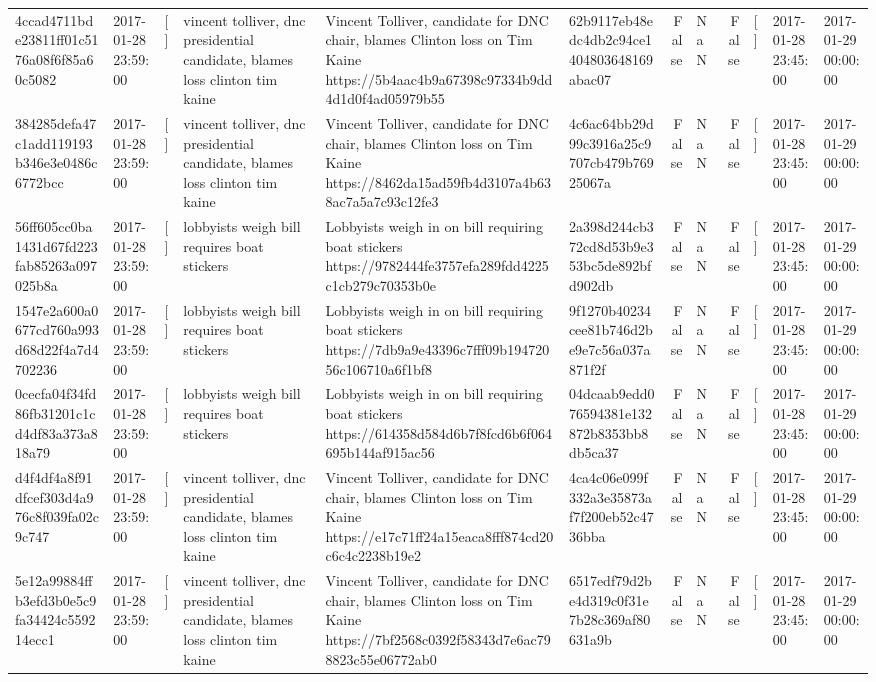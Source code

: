 \begin{tabular}{llllllrlrlll}
4ccad4711bde23811ff01c5176a08f6f85a60c5082 & 2017-01-28 23:59:00 & [] & vincent tolliver, dnc presidential candidate, blames loss clinton tim kaine & Vincent Tolliver, candidate for DNC chair, blames Clinton loss on Tim Kaine https://5b4aac4b9a67398c97334b9dd4d1d0f4ad05979b55 & 62b9117eb48edc4db2c94ce1404803648169abac07 & False & NaN & False & [] & 2017-01-28 23:45:00 & 2017-01-29 00:00:00 \\
384285defa47c1add119193b346e3e0486c6772bcc & 2017-01-28 23:59:00 & [] & vincent tolliver, dnc presidential candidate, blames loss clinton tim kaine & Vincent Tolliver, candidate for DNC chair, blames Clinton loss on Tim Kaine https://8462da15ad59fb4d3107a4b638ac7a5a7c93c12fe3 & 4c6ac64bb29d99c3916a25c9707cb479b76925067a & False & NaN & False & [] & 2017-01-28 23:45:00 & 2017-01-29 00:00:00 \\
56ff605cc0ba1431d67fd223fab85263a097025b8a & 2017-01-28 23:59:00 & [] & lobbyists weigh bill requires boat stickers & Lobbyists weigh in on bill requiring boat stickers https://9782444fe3757efa289fdd4225c1cb279c70353b0e & 2a398d244cb372cd8d53b9e353bc5de892bfd902db & False & NaN & False & [] & 2017-01-28 23:45:00 & 2017-01-29 00:00:00 \\
1547e2a600a0677cd760a993d68d22f4a7d4702236 & 2017-01-28 23:59:00 & [] & lobbyists weigh bill requires boat stickers & Lobbyists weigh in on bill requiring boat stickers https://7db9a9e43396c7fff09b19472056c106710a6f1bf8 & 9f1270b40234cee81b746d2be9e7c56a037a871f2f & False & NaN & False & [] & 2017-01-28 23:45:00 & 2017-01-29 00:00:00 \\
0cecfa04f34fd86fb31201c1cd4df83a373a818a79 & 2017-01-28 23:59:00 & [] & lobbyists weigh bill requires boat stickers & Lobbyists weigh in on bill requiring boat stickers https://614358d584d6b7f8fcd6b6f064695b144af915ac56 & 04dcaab9edd076594381e132872b8353bb8db5ca37 & False & NaN & False & [] & 2017-01-28 23:45:00 & 2017-01-29 00:00:00 \\
d4f4df4a8f91dfcef303d4a976c8f039fa02c9c747 & 2017-01-28 23:59:00 & [] & vincent tolliver, dnc presidential candidate, blames loss clinton tim kaine & Vincent Tolliver, candidate for DNC chair, blames Clinton loss on Tim Kaine https://e17c71ff24a15eaca8fff874cd20c6c4c2238b19e2 & 4ca4c06e099f332a3e35873af7f200eb52c4736bba & False & NaN & False & [] & 2017-01-28 23:45:00 & 2017-01-29 00:00:00 \\
5e12a99884ffb3efd3b0e5c9fa34424c559214ecc1 & 2017-01-28 23:59:00 & [] & vincent tolliver, dnc presidential candidate, blames loss clinton tim kaine & Vincent Tolliver, candidate for DNC chair, blames Clinton loss on Tim Kaine https://7bf2568c0392f58343d7e6ac798823c55e06772ab0 & 6517edf79d2be4d319c0f31e7b28c369af80631a9b & False & NaN & False & [] & 2017-01-28 23:45:00 & 2017-01-29 00:00:00 \\

\end{tabular}
